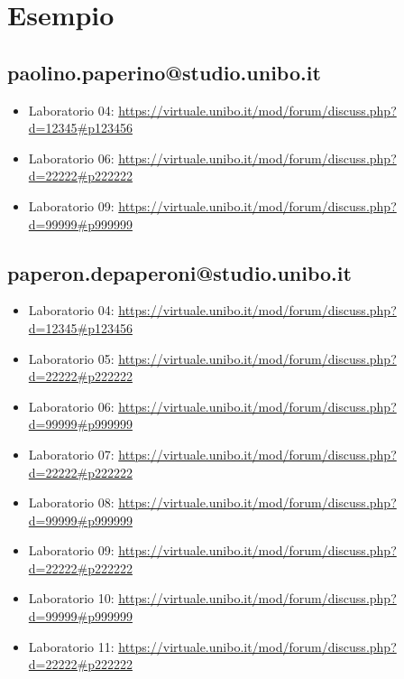 \documentclass[a4paper,12pt]{report}
\begin{document}
\section*{Esempio}

\subsection{paolino.paperino@studio.unibo.it}

\begin{itemize}
	\item Laboratorio 04: \url{https://virtuale.unibo.it/mod/forum/discuss.php?d=12345#p123456}
	\item Laboratorio 06: \url{https://virtuale.unibo.it/mod/forum/discuss.php?d=22222#p222222}
	\item Laboratorio 09: \url{https://virtuale.unibo.it/mod/forum/discuss.php?d=99999#p999999}
\end{itemize}

\subsection{paperon.depaperoni@studio.unibo.it}

\begin{itemize}
	\item Laboratorio 04: \url{https://virtuale.unibo.it/mod/forum/discuss.php?d=12345#p123456}
	\item Laboratorio 05: \url{https://virtuale.unibo.it/mod/forum/discuss.php?d=22222#p222222}
	\item Laboratorio 06: \url{https://virtuale.unibo.it/mod/forum/discuss.php?d=99999#p999999}
	\item Laboratorio 07: \url{https://virtuale.unibo.it/mod/forum/discuss.php?d=22222#p222222}
	\item Laboratorio 08: \url{https://virtuale.unibo.it/mod/forum/discuss.php?d=99999#p999999}
	\item Laboratorio 09: \url{https://virtuale.unibo.it/mod/forum/discuss.php?d=22222#p222222}
	\item Laboratorio 10: \url{https://virtuale.unibo.it/mod/forum/discuss.php?d=99999#p999999}
	\item Laboratorio 11: \url{https://virtuale.unibo.it/mod/forum/discuss.php?d=22222#p222222}
\end{itemize}


% 
% 
\end{document}

